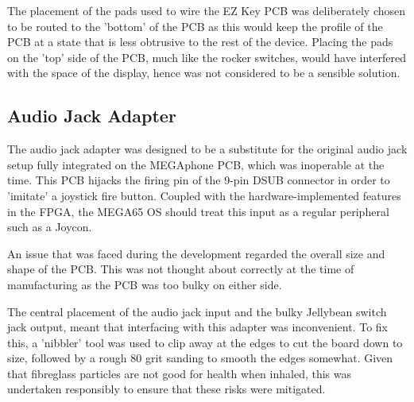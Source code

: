 The placement of the pads used to wire the EZ Key PCB was deliberately chosen to be routed to the 'bottom' of the PCB as this would keep the profile of the PCB at a state that is less obtrusive to the rest of the device.
Placing the pads on the 'top' side of the PCB, much like the rocker switches, would have interfered with the space of the display, hence was not considered to be a sensible solution.

\subsection{Audio Jack Adapter}

The audio jack adapter was designed to be a substitute for the original audio jack setup fully integrated on the MEGAphone PCB, which was inoperable at the time.
This PCB hijacks the firing pin of the 9-pin DSUB connector in order to 'imitate' a joystick fire button. 
Coupled with the hardware-implemented features in the FPGA, the MEGA65 OS should treat this input as a regular peripheral such as a Joycon.

An issue that was faced during the development regarded the overall size and shape of the PCB.
This was not thought about correctly at the time of manufacturing as the PCB was too bulky on either side.

The central placement of the audio jack input and the bulky Jellybean switch jack output, meant that interfacing with this adapter was inconvenient.
To fix this, a 'nibbler' tool was used to clip away at the edges to cut the board down to size, followed by a rough 80 grit sanding to smooth the edges somewhat.
Given that fibreglass particles are not good for health when inhaled, this was undertaken responsibly to ensure that these risks were mitigated.


